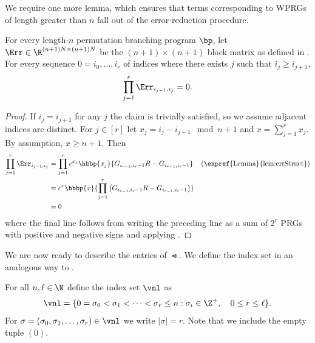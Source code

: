 We require one more lemma, which ensures that terms corresponding to WPRGs of length greater than $n$ fall out of the %
error-reduction %
procedure. 
\begin{lemma}\label{lem:noLongCycles}
  For every length-$n$ permutation branching program $\bp$, let $\Err\in \R^{(n+1)N\times (n+1)N}$ be the $(n+1)\times(n+1)$ block matrix as defined in . For every
%
sequence $0=i_0,\ldots,i_r$ of indices %
where there exists $j$ such that $i_j\geq i_{j+1}$,
\[\prod_{j=1}^r\Err_{i_{j-1},i_j} = 0.\]
\end{lemma}
\begin{proof}
If $i_j=i_{j+1}$ for any $j$ the claim is trivially satisfied, so we assume adjacent indices are distinct.
For $j\in[r]$ let $x_j=i_{j}-i_{j-1}\mod n+1$ and $x=\sum_{j=1}^rx_j$. By assumption, $x \geq n+1$. Then 
\begin{align*}
    \prod_{j=1}^r\Err_{i_{j-1},i_j} &= \prod_{j=1}^r c^{x_j}\hbbp{x_j}{G_{i_{r-1},i_r-1}R-G_{i_{r-1},i_r-1}}
    && \text{(\expref{Lemma}{lem:errStruct})}\\
    &= c^x\hbbp{x}{\prod_{j=1}^r \left(G_{i_{r-1},i_r-1}R-G_{i_{r-1},i_r-1}\right)}\\
    &= 0%
\end{align*}
%
where %
the final line follows from writing the %
preceding %
line as a sum of $2^r$ PRGs with positive and negative %
signs %
and applying .
\end{proof}

We are now ready to describe the entries of $\Lt$. We define the index set in an analogous way to .
\begin{definition}\label{def:cycleIndex}
For all $n,\ell \in \N$ define the index set $\vnl$ as
\[\vnl = \{0 =\sigma_0< \sigma_1<\dots<\sigma_r\leq n : \sigma_i\in \Z^+, \quad 0\leq r\leq \ell\}.\]
For $\sigma =(\sigma_0,\sigma_1,\dots,\sigma_r)\in \vnl$ we write $|\sigma|=r$. Note that we include the empty tuple $(0)$.
\end{definition}

